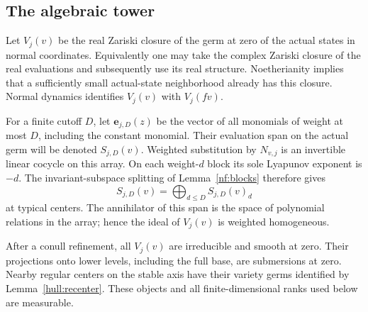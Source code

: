 \subsection{The algebraic tower}

Let $V_j(v)$ be the real Zariski closure of the germ at zero of the actual
states in normal coordinates. Equivalently one may take the complex
Zariski closure of the real evaluations and subsequently use its real
structure. Noetherianity implies that a sufficiently small actual-state
neighborhood already has this closure. Normal dynamics identifies
$V_j(v)$ with $V_j(fv)$.

For a finite cutoff $D$, let $\mathbf e_{j,D}(z)$ be the vector of all
monomials of weight at most $D$, including the constant monomial. Their
evaluation span on the actual germ will be denoted $S_{j,D}(v)$.
Weighted substitution by $N_{v,j}$ is an invertible linear cocycle on
this array. On each weight-$d$ block its sole Lyapunov exponent is $-d$.
The invariant-subspace splitting of Lemma~\ref{nf:blocks} therefore gives
\begin{equation}\label{hull:span-splitting}
 S_{j,D}(v)=\bigoplus_{d\le D} S_{j,D}(v)_d
\end{equation}
at typical centers. The annihilator of this span is the space of
polynomial relations in the array; hence the ideal of $V_j(v)$ is
weighted homogeneous.

\begin{lemma}\label{hull:regular-varieties}
After a conull refinement, all $V_j(v)$ are irreducible and smooth at
zero. Their projections onto lower levels, including the full base,
are submersions at zero. Nearby regular centers on the stable axis
have their variety germs identified by Lemma~\ref{hull:recenter}.
These objects and all finite-dimensional ranks used below are measurable.
\end{lemma}

